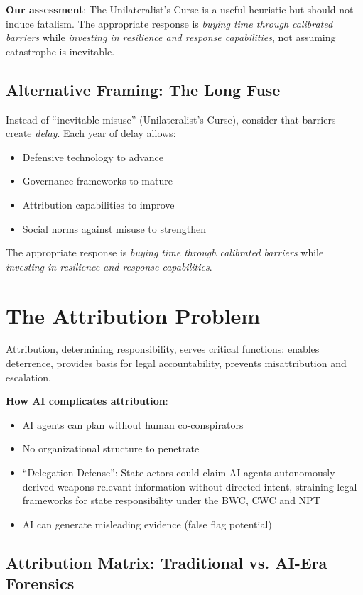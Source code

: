 \documentclass[11pt,letterpaper]{article}
\begin{document}
\textbf{Our assessment}: The Unilateralist's Curse is a useful heuristic but should not induce fatalism. The appropriate response is \textit{buying time through calibrated barriers} while \textit{investing in resilience and response capabilities}, not assuming catastrophe is inevitable.

\subsection{Alternative Framing: The Long Fuse}

Instead of ``inevitable misuse'' (Unilateralist's Curse), consider that barriers create \textit{delay}. Each year of delay allows:
\begin{itemize}
  \item Defensive technology to advance
  \item Governance frameworks to mature
  \item Attribution capabilities to improve
  \item Social norms against misuse to strengthen
\end{itemize}

The appropriate response is \textit{buying time through calibrated barriers} while \textit{investing in resilience and response capabilities}.

\section{The Attribution Problem}

Attribution, determining responsibility, serves critical functions: enables deterrence, provides basis for legal accountability, prevents misattribution and escalation.

\textbf{How AI complicates attribution}:
\begin{itemize}
  \item AI agents can plan without human co-conspirators
  \item No organizational structure to penetrate
  \item ``Delegation Defense'': State actors could claim AI agents autonomously derived weapons-relevant information without directed intent, straining legal frameworks for state responsibility under the BWC, CWC and NPT
  \item AI can generate misleading evidence (false flag potential)
\end{itemize}

\subsection{Attribution Matrix: Traditional vs. AI-Era Forensics}
\end{document}
